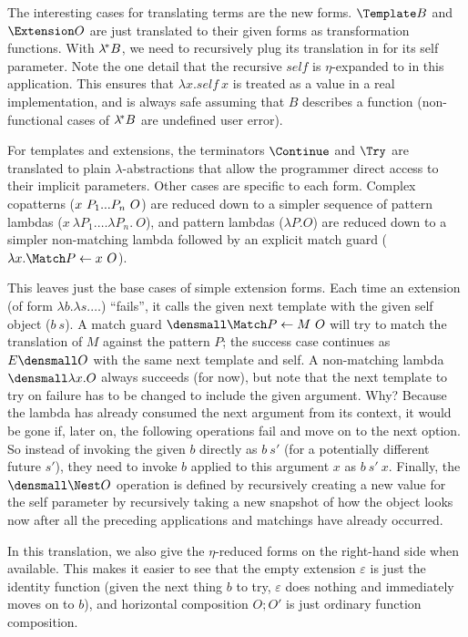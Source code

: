 The interesting cases for translating terms are the new forms.
$\Template B$ and $\Extension O$ are just translated to their given forms as transformation functions.
With $\lambda^{\!*} B$, we need to recursively plug its translation in for its self parameter.
Note the one detail that the recursive $\mathit{self}$ is $\eta$-expanded to in this application.
This ensures that $\lambda x. \mathit{self} ~ x$ is treated as a value in a real implementation, and is always safe assuming that $B$ describes a function (non-functional cases of $\lambda^{\!*} B$ are undefined user error).

For templates and extensions, the terminators $\Continue$ and $\Try$ are translated to plain $\lambda$-abstractions that allow the programmer direct access to their implicit parameters.
Other cases are specific to each form.
Complex copatterns ($x ~ P_1\overset{{}_{}}{...} P_n ~ O$) are reduced down to a simpler sequence of pattern lambdas ($x ~ \lambda P_1. \dots \lambda P_n. ~ O$), and pattern lambdas ($\lambda P. O$) are reduced down to a simpler non-matching lambda followed by an explicit match guard ($\lambda x. \Match P \gets x ~ O$).

This leaves just the base cases of simple extension forms.
Each time an extension (of form $\lambda b. \lambda s. \dots$) ``fails'', it calls the given next template with the given self object ($b~s$).
A match guard $\den{\Match P \gets M ~ O}$ will try to match the translation of $M$ against the pattern $P$; the success case continues as $E\den{O}$ with the same next template and self.
A non-matching lambda $\den{\lambda x. O}$ always succeeds (for now), but note that the next template to try on failure has to be changed to include the given argument.
Why?
Because the lambda has already consumed the next argument from its context, it would be gone if, later on, the following operations fail and move on to the next option.
So instead of invoking the given $b$ directly as $b~s'$ (for a potentially different future $s'$), they need to invoke $b$ applied to this argument $x$ as $b~s'~x$.
Finally, the $\den{\Nest O}$ operation is defined by recursively creating a new value for the self parameter by recursively taking a new snapshot of how the object looks now after all the preceding applications and matchings have already occurred.

In this translation, we also give the $\eta$-reduced forms on the right-hand side when available.
This makes it easier to see that the empty extension $\varepsilon$ is just the identity function (given the next thing $b$ to try, $\varepsilon$ does nothing and immediately moves on to $b$), and horizontal composition $O; O'$ is just ordinary function composition.


